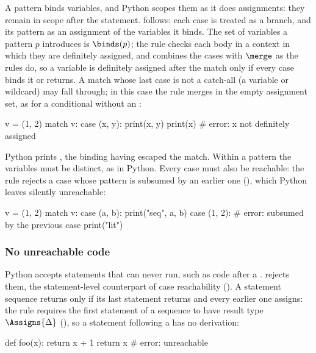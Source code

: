 A  pattern binds variables, and Python scopes them as it does assignments: they remain in
scope after the  statement. \PurePy follows: each case is treated as a branch, and its pattern as an
assignment of the variables it binds. The set of variables a pattern $p$ introduces is $\binds(p)$; the
 rule checks each body in a context in which they are definitely assigned, and combines
the cases with $\merge$ as the  rules do, so a variable is definitely assigned after the match
only if every case binds it or returns. A match whose last case is not a catch-all (a variable or
wildcard) may fall through; in this case the  rule merges in the empty assignment set, as for a
conditional without an :

\begin{python}
v = (1, 2)
match v:
    case (x, y):
        print(x, y)
print(x)  # error: x not definitely assigned
\end{python}

\noindent Python prints , the binding having escaped the match. Within a pattern the
variables must be distinct, as in Python. Every case must also be reachable: the 
rule rejects a case whose pattern is subsumed by an earlier one (), which Python
leaves silently unreachable:

\begin{python}
v = (1, 2)
match v:
    case (a, b):
        print("seq", a, b)
    case (1, 2):  # error: subsumed by the previous case
        print("lit")
\end{python}

\subsubsection{No unreachable code}
\label{sec:unreachable}

Python accepts statements that can never run, such as code after a . \PurePy rejects
them, the statement-level counterpart of case reachability (). A statement
sequence returns only if its last statement returns and every earlier one assigns: the 
rule requires the first statement of a sequence to have result type $\Assigns{\Delta}$
(), so a statement following a  has no derivation:

\begin{python}
def foo(x):
    return x + 1
    return x  # error: unreachable
\end{python}

